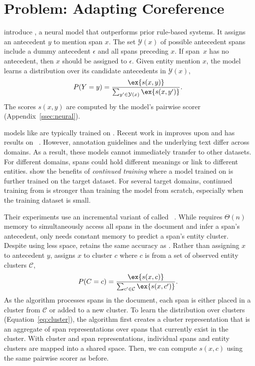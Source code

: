 \section{Problem: Adapting Coreference}
\label{sec:model}


\citet{lee-2018} introduce \ctof{}, a neural model that outperforms prior rule-based systems.
It assigns an antecedent $y$ to mention span $x$. The set
$\mathcal{Y}(x)$ of
possible antecedent spans include a dummy antecedent $\epsilon$ and all spans
preceding $x$.
If span~$x$ has
no antecedent, then $x$ should be assigned to $\epsilon$.  Given entity mention $x$,
the model learns a distribution over its candidate antecedents in $\mathcal{Y}(x)$,
\begin{equation}
    P(Y=y) = \frac{\ex{s(x,y)}}{\sum_{y' \in \mathcal{Y}(x)} \ex{s(x,y')}}.
    \label{eq:antecedent}
\end{equation}
The scores $s(x,y)$ are computed by the model's pairwise scorer
(Appendix~\ref{ssec:neural}).

\coref{} models like \ctof{} are typically trained on \ontonotes{}.
Recent work in \coref{} improves upon \ctof{} and has  results on \ontonotes{}~\citep{wu-2020-corefqa,joshi-2020}.
However, annotation guidelines and the underlying text differ across domains. As a result, these \coref{} models cannot
immediately transfer to other datasets.
For different domains, spans could hold
different meanings or link to different entities.
\citet{xia-2021} show the benefits of \emph{continued training} where a model
trained on \ontonotes{} is further trained on the target dataset.
For several target domains, continued training from \ontonotes{} is stronger than
training the model from scratch, especially when the training dataset is small.

Their experiments use an incremental variant of \ctof{} called
\icoref{}~\citep{xia-2020}.
While \ctof{} requires $\Theta(n)$ memory to simultaneously access all spans in
the document and infer a span's antecedent,
\icoref{} only needs constant memory to predict a span's entity
cluster.
Despite using less space, \icoref{} retains the same accuracy as \ctof{}.
Rather than assigning $x$ to antecedent $y$, \icoref{}
 assigns $x$ to cluster $c$ where $c$ is from a set of observed entity clusters $\mathcal{C}$,
\begin{equation}
    P(C=c) = \frac{\ex{s(x,c)}}{\sum_{c' \in \mathcal{C}} \ex{s(x,c')}}.
    \label{eq:cluster}
\end{equation}
As the algorithm processes spans in the
document, each span is either placed in a cluster from $\mathcal{C}$ or
added to a new cluster.
To learn the distribution over clusters (Equation~\ref{eq:cluster}), the algorithm first creates a cluster
representation that is an aggregate of span
representations over spans that currently exist in the cluster.
With cluster and span representations, individual spans and entity clusters are
mapped into a shared space. Then, we can compute $s(x,c)$ using the same pairwise scorer as before.

